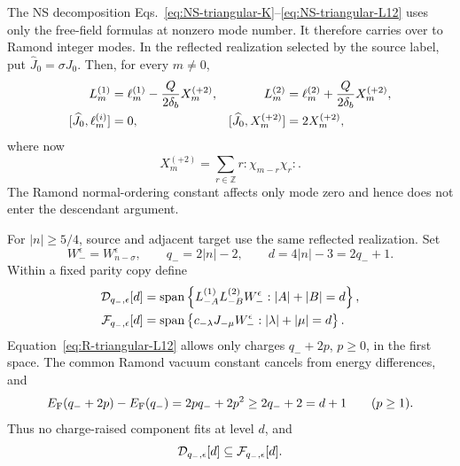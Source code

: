 \documentclass[11pt]{article}
\begin{document}
The NS decomposition
Eqs.~\eqref{eq:NS-triangular-K}--\eqref{eq:NS-triangular-L12} uses only
the free-field formulas at nonzero mode number.  It therefore carries over
to Ramond integer modes.  In the reflected realization selected by the
source label, put \(\widehat J_0=\sigma J_0\).  Then, for every \(m\ne0\),
\begin{align}
 L_m^{(1)}&=\ell_m^{(1)}-\frac{Q}{2\delta_b}X_m^{(+2)},
 &
 L_m^{(2)}&=\ell_m^{(2)}+\frac{Q}{2\delta_b}X_m^{(+2)},
 \notag\\
 [\widehat J_0,\ell_m^{(i)}]&=0,
 &
 [\widehat J_0,X_m^{(+2)}]&=2X_m^{(+2)},
 \label{eq:R-triangular-L12}
\end{align}
where now
\begin{equation}
 X_m^{(+2)}=\sum_{r\in\mathbb Z}r:\!\chi_{m-r}\chi_r\!:.
\end{equation}
The Ramond normal-ordering constant affects only mode zero and hence does
not enter the descendant argument.

For \(|n|\geq5/4\), source and adjacent target use the same reflected
realization.  Set
\begin{equation}
 W_-^\epsilon=W_{n-\sigma}^\epsilon,
 \qquad
 q_-=2|n|-2,
 \qquad
 d=4|n|-3=2q_-+1.
\end{equation}
Within a fixed parity copy define
\begin{align}
 {\cal D}_{q_-,\epsilon}[d]
 &={\rm span}\left\{
 L_{-A}^{(1)}L_{-B}^{(2)}W_-^\epsilon:
 |A|+|B|=d\right\},
 \notag\\
 {\cal F}_{q_-,\epsilon}[d]
 &={\rm span}\left\{
 c_{-\lambda}J_{-\mu}W_-^\epsilon:
 |\lambda|+|\mu|=d\right\}.
 \label{eq:R-D-and-F-spaces}
\end{align}
Equation~\eqref{eq:R-triangular-L12} allows only charges
\(q_-+2p\), \(p\geq0\), in the first space.  The common Ramond vacuum
constant cancels from energy differences, and
\begin{equation}
 E_{\rm F}(q_-+2p)-E_{\rm F}(q_-)
 =2pq_-+2p^2
 \geq 2q_-+2=d+1
 \qquad(p\geq1).
 \label{eq:R-charge-raising-gap}
\end{equation}
Thus no charge-raised component fits at level \(d\), and
\begin{equation}
 {\cal D}_{q_-,\epsilon}[d]
 \subseteq {\cal F}_{q_-,\epsilon}[d].
\end{equation}
\end{document}
